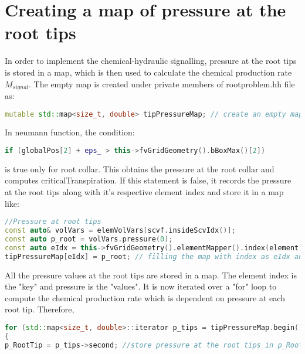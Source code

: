 \section*{Creating a map of pressure at the root tips}
In order to implement the chemical-hydraulic signalling, pressure at the root tips is stored in a map, which is then used to calculate the chemical production rate $M_{signal}$. The empty map is created under private members of rootproblem.hh file as:

\begin{lstlisting}[language=C++, caption={Store pressure at the root tips in a map}]
mutable std::map<size_t, double> tipPressureMap; // create an empty map for pressure at root tips
\end{lstlisting}

In neumann function, the condition:

\begin{lstlisting}[language=C++, caption={pressure at root collar}]
if (globalPos[2] + eps_ > this->fvGridGeometry().bBoxMax()[2])
\end{lstlisting}

is true only for root collar. This obtains the pressure at the root collar and computes criticalTranspiration. If this statement is false, it records the pressure at the root tips along with it's respective element index and store it in a map like:

\begin{lstlisting}[language=C++, caption={pressure at root tips}]
//Pressure at root tips
const auto& volVars = elemVolVars[scvf.insideScvIdx()];
const auto p_root = volVars.pressure(0);
const auto eIdx = this->fvGridGeometry().elementMapper().index(element);
tipPressureMap[eIdx] = p_root; // filling the map with index as eIdx and value as pressure at root tips 
\end{lstlisting}

All the pressure values at the root tips are stored in a map. The element index is the "key" and pressure is the "values". It is now iterated over a "for" loop to compute the chemical production rate which is dependent on pressure at each root tip. Therefore,

\begin{lstlisting}[language=C++, caption={iterating pressure map}]
for (std::map<size_t, double>::iterator p_tips = tipPressureMap.begin(); p_tips != tipPressureMap.end(); p_tips++) 
{
p_RootTip = p_tips->second; //store pressure at the root tips in p_RootTip
\end{lstlisting}

